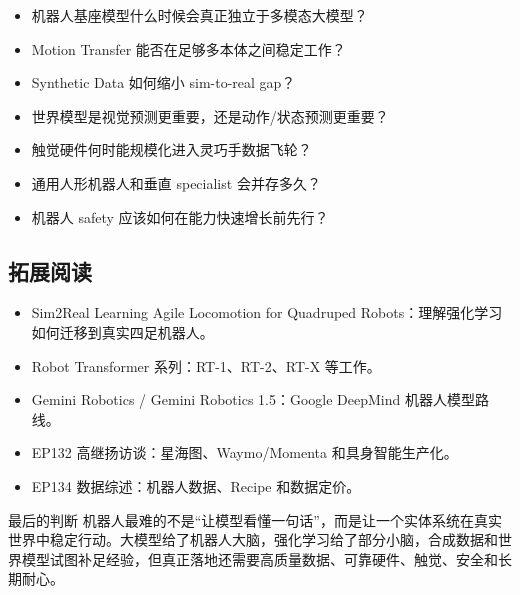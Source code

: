 \documentclass[a4paper]{article}
\begin{document}
\begin{itemize}
\item 机器人基座模型什么时候会真正独立于多模态大模型？
\item Motion Transfer 能否在足够多本体之间稳定工作？
\item Synthetic Data 如何缩小 sim-to-real gap？
\item 世界模型是视觉预测更重要，还是动作/状态预测更重要？
\item 触觉硬件何时能规模化进入灵巧手数据飞轮？
\item 通用人形机器人和垂直 specialist 会并存多久？
\item 机器人 safety 应该如何在能力快速增长前先行？
\end{itemize}

\subsection{拓展阅读}

\begin{itemize}
\item Sim2Real Learning Agile Locomotion for Quadruped Robots：理解强化学习如何迁移到真实四足机器人。
\item Robot Transformer 系列：RT-1、RT-2、RT-X 等工作。
\item Gemini Robotics / Gemini Robotics 1.5：Google DeepMind 机器人模型路线。
\item EP132 高继扬访谈：星海图、Waymo/Momenta 和具身智能生产化。
\item EP134 数据综述：机器人数据、Recipe 和数据定价。
\end{itemize}

\begin{importantbox}{最后的判断}
机器人最难的不是“让模型看懂一句话”，而是让一个实体系统在真实世界中稳定行动。大模型给了机器人大脑，强化学习给了部分小脑，合成数据和世界模型试图补足经验，但真正落地还需要高质量数据、可靠硬件、触觉、安全和长期耐心。
\end{importantbox}
\end{document}
